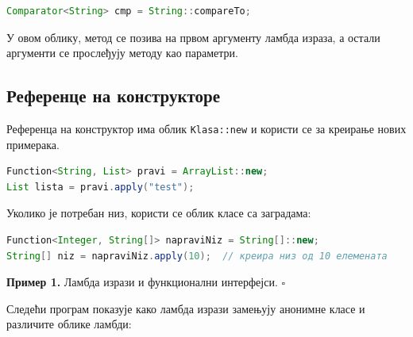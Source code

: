 \begin{lstlisting}[language=Java]
Comparator<String> cmp = String::compareTo;
\end{lstlisting}


У овом облику, метод се позива на првом аргументу ламбда израза, а остали аргументи се прослеђују методу као параметри.


\subsection{Референце на конструкторе}

Референца на конструктор има облик \texttt{Klasa::new} и користи се за креирање нових примерака.

\begin{lstlisting}[language=Java]
Function<String, List> pravi = ArrayList::new;
List lista = pravi.apply("test");
\end{lstlisting}


Уколико је потребан низ, користи се облик класе са заградама:

\begin{lstlisting}[language=Java]
Function<Integer, String[]> napraviNiz = String[]::new;
String[] niz = napraviNiz.apply(10);  // креира низ од 10 елемената
\end{lstlisting}


\bigskip

\noindent \textbf{Пример 1.} Ламбда изрази и функционални интерфејси. $\square$

\medskip

Следећи програм показује како ламбда изрази замењују анонимне класе и различите облике ламбди:

